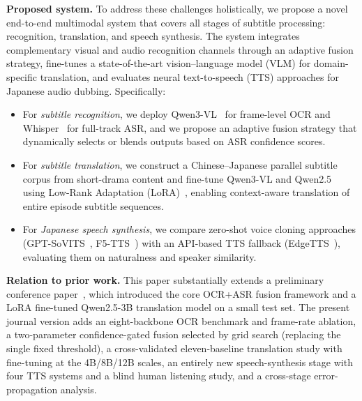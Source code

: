 \documentclass[mathematics,article,submit,xetex,moreauthors]{Definitions/mdpi}
\begin{document}
\textbf{Proposed system.}
To address these challenges holistically, we propose a novel end-to-end multimodal system that covers all stages of subtitle processing: recognition, translation, and speech synthesis.
The system integrates complementary visual and audio recognition channels through an adaptive fusion strategy, fine-tunes a state-of-the-art vision--language model (VLM) for domain-specific translation, and evaluates neural text-to-speech (TTS) approaches for Japanese audio dubbing.
Specifically:
\begin{itemize}
 \item For \textit{subtitle recognition}, we deploy Qwen3-VL~\cite{qwen3vl2025} for frame-level OCR and Whisper~\cite{radford2023robust} for full-track ASR, and we propose an adaptive fusion strategy that dynamically selects or blends outputs based on ASR confidence scores.
 \item For \textit{subtitle translation}, we construct a Chinese--Japanese parallel subtitle corpus from short-drama content and fine-tune Qwen3-VL and Qwen2.5~\cite{yang2024qwen2} using Low-Rank Adaptation (LoRA)~\cite{hu2022lora}, enabling context-aware translation of entire episode subtitle sequences.
 \item For \textit{Japanese speech synthesis}, we compare zero-shot voice cloning approaches (GPT-SoVITS~\cite{gptsovits2024}, F5-TTS~\cite{chen2024f5tts}) with an API-based TTS fallback (EdgeTTS~\cite{edgetts2024}), evaluating them on naturalness and speaker similarity.
\end{itemize}

\textbf{Relation to prior work.}
This paper substantially extends a preliminary conference paper~\cite{an2026icassp}, which introduced the core OCR+ASR fusion framework and a LoRA fine-tuned Qwen2.5-3B translation model on a small test set.
The present journal version adds an eight-backbone OCR benchmark and frame-rate ablation, a two-parameter confidence-gated fusion selected by grid search (replacing the single fixed threshold), a cross-validated eleven-baseline translation study with fine-tuning at the 4B/8B/12B scales, an entirely new speech-synthesis stage with four TTS systems and a blind human listening study, and a cross-stage error-propagation analysis.
\end{document}
